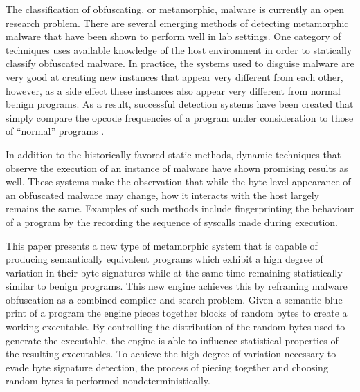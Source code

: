 
    The classification of obfuscating, or metamorphic, malware is currently an
    open research problem. There are several emerging methods of detecting
    metamorphic malware that have been shown to perform well in lab settings.
    One category of techniques uses available knowledge of the host environment
    in order to statically classify obfuscated malware. In practice, the systems
    used to disguise malware are very good at creating new instances that appear
    very different from each other, however, as a side effect these instances
    also appear very different from normal benign programs. As a result,
    successful detection systems have been created that simply compare the
    opcode frequencies of a program under consideration to those of ``normal''
    programs \cite{histogram}.

    In addition to the historically favored static methods, dynamic techniques
    that observe the execution of an instance of malware have shown promising
    results as well. These systems make the observation that while the byte
    level appearance of an obfuscated malware may change, how it interacts with
    the host largely remains the same. Examples of such methods include
    fingerprinting the behaviour of a program by the recording the sequence of
    syscalls made during execution.

    
    This paper presents a new type of metamorphic system that is capable of
    producing semantically equivalent programs which exhibit a high degree of
    variation in their byte signatures while at the same time remaining
    statistically similar to benign programs. This new engine achieves this by
    reframing malware obfuscation as a combined compiler and search problem.
    Given a semantic blue print of a program the engine pieces together blocks
    of random bytes to create a working executable. By controlling the
    distribution of the random bytes used to generate the executable, the engine
    is able to influence statistical properties of the resulting executables. To
    achieve the high degree of variation necessary to evade byte signature
    detection, the process of piecing together and choosing random bytes is
    performed nondeterministically.
